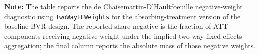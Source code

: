 \begin{table}[htbp]
    \caption{Negative-Weight Diagnostic for the Baseline TWFE Design}
    \label{tab:negative-weights}
    \centering
    \small
    \renewcommand{\arraystretch}{1.08}
    \vspace{1.0em}
    \begin{minipage}{0.92\textwidth}
        {\footnotesize \textbf{Note:} The table reports the de Chaisemartin-D'Haultfoeuille negative-weight diagnostic using \texttt{TwoWayFEWeights} for the absorbing-treatment version of the baseline BVR design. The reported share negative is the fraction of ATT components receiving negative weight under the implied two-way fixed-effects aggregation; the final column reports the absolute mass of those negative weights. \par}
    \end{minipage}
\end{table}
